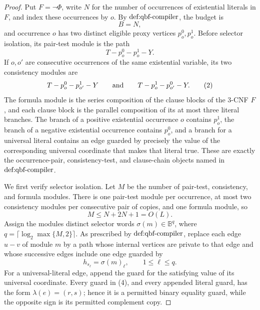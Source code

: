 \documentclass{article}
\begin{document}
\begin{proof}
Put \(F=\neg\Phi\), write \(N\) for the number of occurrences of existential literals in \(F\), and index these occurrences by \(o\).  By \(\textnormal{def:qbf-compiler}\), the budget is
\[
B=N,
\]
and occurrence \(o\) has two distinct eligible proxy vertices \(p_o^0,p_o^1\).  Before selector isolation, its pair-test module is the path
\[
T-p_o^0-p_o^1-Y. \tag{1}
\]
If \(o,o'\) are consecutive occurrences of the same existential variable, its two consistency modules are
\[
T-p_o^0-p_{o'}^1-Y
\qquad\hbox{and}\qquad
T-p_o^1-p_{o'}^0-Y. \tag{2}
\]
The formula module is the series composition of the clause blocks of the \(3\)-CNF \(F\), and each clause block is the parallel composition of its at most three literal branches.  The branch of a positive existential occurrence \(o\) contains \(p_o^1\), the branch of a negative existential occurrence contains \(p_o^0\), and a branch for a universal literal contains an edge guarded by precisely the value of the corresponding universal coordinate that makes that literal true.  These are exactly the occurrence-pair, consistency-test, and clause-chain objects named in \(\textnormal{def:qbf-compiler}\).

We first verify selector isolation.  Let \(M\) be the number of pair-test, consistency, and formula modules.  There is one pair-test module per occurrence, at most two consistency modules per consecutive pair of copies, and one formula module, so
\[
M\le N+2N+1=O(L). \tag{3}
\]
Assign the modules distinct selector words \(\sigma(m)\in\mathbb B^q\), where \(q=\lceil\log_2\max\{M,2\}\rceil\).  As prescribed by \(\textnormal{def:qbf-compiler}\), replace each edge \(u-v\) of module \(m\) by a path whose internal vertices are private to that edge and whose successive edges include one edge guarded by
\[
h_{s_\ell}=\sigma(m)_\ell,
\qquad 1\le \ell\le q. \tag{4}
\]
For a universal-literal edge, append the guard for the satisfying value of its universal coordinate.  Every guard in (4), and every appended literal guard, has the form \(\lambda(e)=(r,s)\); hence it is a permitted binary equality guard, while the opposite sign is its permitted complement copy.


\end{proof}
\end{document}
